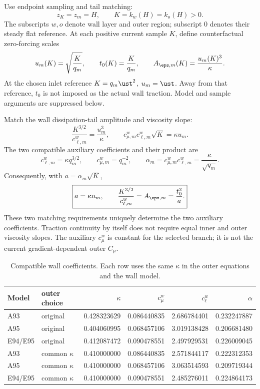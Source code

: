 Use endpoint sampling and tail matching:
\begin{equation}
 \boxed{z_K=z_m=H,\qquad K=k_w(H)=k_o(H)>0.}
 \label{mawf:sampling}
\end{equation}
The subscripts \(w,o\) denote wall layer and outer region; subscript
\(0\) denotes their steady flat reference. At each positive current
sample \(K\), define counterfactual zero-forcing scales
\begin{equation}
 u_m(K)=\sqrt{\frac K{q_m}},\qquad
 t_0(K)=\frac K{q_m},\qquad
 A_{\eps,m}(K)=\frac{u_m(K)^3}{\kappa}.
 \label{mawf:scales}
\end{equation}
At the chosen inlet reference \(K=q_m\ust^2\), \(u_m=\ust\).
Away from that reference, \(t_0\) is not imposed as the actual
wall traction. Model and sample arguments are suppressed below.

Match the wall dissipation-tail amplitude and viscosity slope:
\begin{equation}
 \frac{K^{3/2}}{c_{\ell,m}^w}=\frac{u_m^3}{\kappa},\qquad
 c_{\mu,m}^wc_{\ell,m}^w\sqrt K=\kappa u_m.
\end{equation}
The two compatible auxiliary coefficients and their product are
\begin{equation}
 \boxed{c_{\ell,m}^w=\kappa q_m^{3/2},\qquad
 c_{\mu,m}^w=q_m^{-2},\qquad
 \alpha_m=c_{\mu,m}^wc_{\ell,m}^w=\frac{\kappa}{\sqrt{q_m}}.}
 \label{mawf:wall-coefficients}
\end{equation}
Consequently, with \(a=\alpha_m\sqrt K\),
\begin{equation}
 \boxed{a=\kappa u_m,\qquad
 \frac{K^{3/2}}{c_{\ell,m}^w}=A_{\eps,m}=\frac{t_0^2}{a}.}
 \label{mawf:identities}
\end{equation}
These two matching requirements uniquely determine the two auxiliary
coefficients. Traction continuity by itself does not require
equal inner and outer viscosity slopes.
The auxiliary \(c_\mu^w\) is constant for the selected branch;
it is not the current gradient-dependent outer \(C_\mu\).

\begin{table}[htbp]
\centering\small
\caption{Compatible wall coefficients. Each row uses the same
\(\kappa\) in the outer equations and the wall model.}
\label{mawf:coefficient-table}
\begin{tabular}{@{}llrrrr@{}}
\toprule
Model&outer choice&\(\kappa\)&\(c_\mu^w\)&\(c_\ell^w\)&\(\alpha\)\\
\midrule
A93&original&0.428323629&0.086440835&2.686784401&0.232247887\\
A95&original&0.404060995&0.068457106&3.019138428&0.206681480\\
E94/E95&original&0.412087472&0.090478551&2.497929531&0.226009045\\
\midrule
A93&common \(\kappa\)&0.410000000&0.086440835&2.571844117&0.222312353\\
A95&common \(\kappa\)&0.410000000&0.068457106&3.063514593&0.209719344\\
E94/E95&common \(\kappa\)&0.410000000&0.090478551&2.485276011&0.224864173\\
\bottomrule
\end{tabular}
\end{table}

